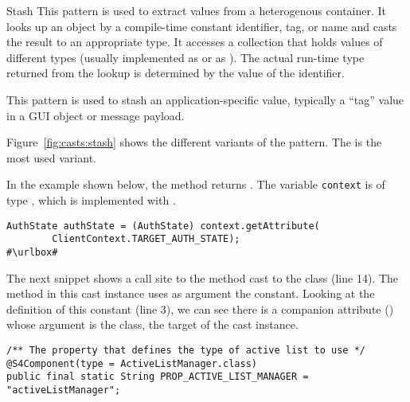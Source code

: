 \begin{pattern}{Stash}
This pattern is used to extract values from a heterogenous container.
It looks up an object by a compile-time constant identifier, tag, or name and casts the result to an appropriate type.
It accesses a collection that holds values of different types
(usually implemented as  or as ).
The actual run-time type returned from the lookup is determined by the value of the identifier.

This pattern is used to stash an application-specific value,
typically a ``tag'' value in a GUI object or message payload.

\instances{}
Figure~\ref{fig:casts:stash} shows the different variants of the pattern.
The  is the most used variant.


In the example shown below,
the  method returns .
The variable \texttt{context} is of type ,
which is implemented with .

\def\urlvar{http://bit.ly/loopj_android_async_http_2SUzY4E}
\begin{verbatim}
AuthState authState = (AuthState) context.getAttribute(
        ClientContext.TARGET_AUTH_STATE);
#\urlbox#
\end{verbatim}

The next snippet shows a call site to the  method cast to the  class (line 14).
The  method in this cast instance uses as argument the  constant.
Looking at the definition of this constant (line 3),
we can see there is a companion attribute () whose argument is the  class, the target of the cast instance.

\def\urlvar{http://bit.ly/skerit_cmusphinx_2HGgL1D}
\begin{verbatim}
/** The property that defines the type of active list to use */
@S4Component(type = ActiveListManager.class)
public final static String PROP_ACTIVE_LIST_MANAGER = "activeListManager";


\end{verbatim}
\end{pattern}
